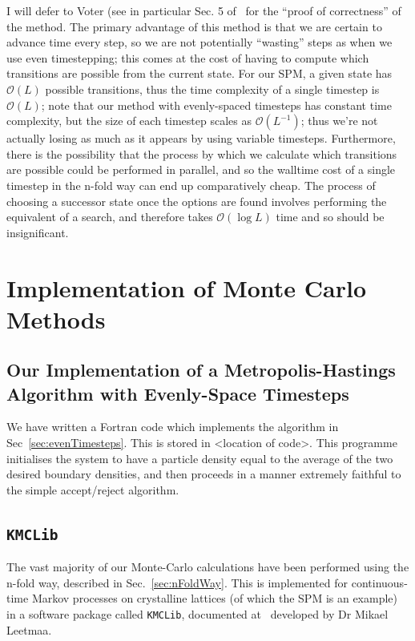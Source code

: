 I will defer to Voter (see in particular Sec. 5 of~\cite{voterKMC} for the ``proof of correctness'' of the
method. The primary advantage of this method is that we are certain to advance time every step, so we are
not potentially
``wasting'' steps as
when we use even 
timestepping; this comes at the cost of having to compute which transitions are possible from the current
state. For our SPM, a given state has $\mathcal{O}(L)$ possible transitions, thus the time complexity
of a single timestep is $\mathcal{O}(L)$; note that our method with evenly-spaced timesteps has constant
time complexity, but the size of each timestep scales as $\mathcal{O}(L^{-1})$; thus we're not actually
losing as much as it appears by using variable timesteps. Furthermore, there is the possibility that the
process by which we calculate which transitions are possible could be performed in parallel, and so
the walltime cost of a single timestep in the n-fold way can end up comparatively cheap. The process of
choosing a successor state once the options are found involves performing the equivalent of a search, and
therefore takes $\mathcal{O}(\log{L})$ time and so should be insignificant.


\section{Implementation of Monte Carlo Methods}
\subsection{Our Implementation of a Metropolis-Hastings Algorithm with Evenly-Space Timesteps}
We have written a Fortran code which implements the algorithm in Sec~\ref{sec:evenTimesteps}. This is
stored in <location of code>. This programme initialises the system to have a particle density
equal to the average of the two desired boundary densities, and then proceeds in a manner extremely
faithful to the simple accept/reject algorithm.


\subsection{\texttt{KMCLib}} \label{sec:kmcLib}
The vast majority of our Monte-Carlo calculations have been performed using the n-fold way, described in
Sec.~\ref{sec:nFoldWay}. This is implemented for continuous-time Markov processes on crystalline lattices
(of which the SPM is an example) in a software package called \texttt{KMCLib}, documented 
at~\cite{leetmaa2014KMCLib} developed by Dr Mikael Leetmaa.

